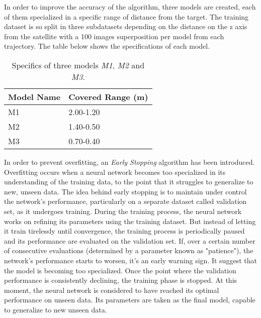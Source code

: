In order to improve the accuracy of the algorithm, three models are created, each of them specialized in a specific range of distance from the target. The training dataset is so split in three subdatasets depending on the distance on the z axis from the satellite with a 100 images superposition per model from each trajectory. The table below shows the specifications of each model.
\begin{table}[H]
\label{tab:Landmark Mapping Models}
\centering
\begin{tabular}{l|l}
\toprule
Model Name & Covered Range (m)\\
\midrule
M1 & 2.00-1.20 \\
M2 & 1.40-0.50 \\
M3 & 0.70-0.40 \\
\bottomrule
\end{tabular}
\caption{Specifics of three models \textit{M1}, \textit{M2} and \textit{M3}.}
\end{table}
In order to prevent overfitting, an \textit{Early Stopping} algorithm \cite{T81-558} has been introduced. Overfitting occurs when a neural network becomes too specialized in its understanding of the training data, to the point that it struggles to generalize to new, unseen data. The idea behind early stopping is to maintain under control the network's performance, particularly on a separate dataset called validation set, as it undergoes training.
During the training process, the neural network works on refining its parameters using the training dataset. But instead of letting it train tirelessly until convergence, the training process is periodically paused and its performance are evaluated on the validation set. If, over a certain number of consecutive evaluations (determined by a parameter known as "patience"), the network's performance starts to worsen, it's an early warning sign. It suggest that the model is becoming too specialized. Once the point where the validation performance is consistently declining, the training phase is stopped. At this moment, the neural network is considered to have reached its optimal performance on unseen data. Its parameters are taken as the final model, capable to generalize to new unseen data.
